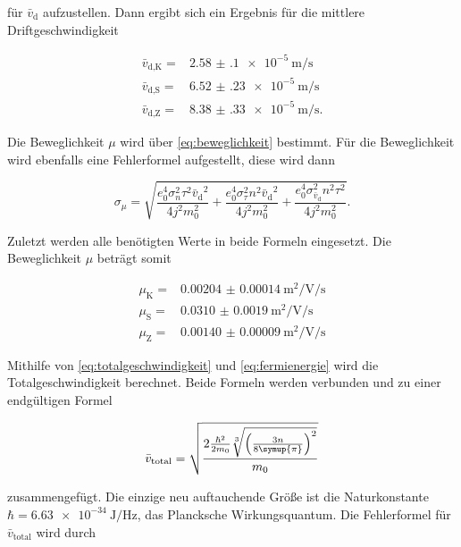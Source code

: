 für $\bar{v}_\text{d}$ aufzustellen.
Dann ergibt sich ein Ergebnis für die mittlere Driftgeschwindigkeit 

\begin{align}
    \bar{v}_\text{d,K} =& \SI{2.58(10)e-5}{\meter\per\second} \\
    \bar{v}_\text{d,S} =& \SI{6.52(23)e-5}{\meter\per\second} \\
    \bar{v}_\text{d,Z} =& \SI{8.38(33)e-5}{\meter\per\second}.
    \label{eq:vd1}
\end{align}

Die Beweglichkeit $\mu$ wird über \autoref{eq:beweglichkeit} bestimmt.
Für die Beweglichkeit wird ebenfalls eine Fehlerformel aufgestellt, diese wird dann

\begin{equation}
    \sigma _{\mu} = \sqrt{\frac{e_{0}^{4} \sigma_{n}^{2} \tau^{2} {\bar{v}_\text{d}}^{2}}{4 j^{2} m_{0}^{2}} + \frac{e_{0}^{4} \sigma_{\tau}^{2} n^{2} {\bar{v}_\text{d}}^{2}}{4 j^{2} m_{0}^{2}} + \frac{e_{0}^{4} \sigma_{\bar{v}_\text{d}}^{2} n^{2} \tau^{2}}{4 j^{2} m_{0}^{2}}}.
    \label{eq:bewegl_fehler}
\end{equation}

Zuletzt werden alle benötigten Werte in beide Formeln eingesetzt.
Die Beweglichkeit $\mu$ beträgt somit

\begin{align}
    \mu _\text{K} =& \SI{0.00204(14)}{\meter\squared\per\volt\per\second}\\
    \mu _\text{S} =& \SI{0.0310(19)}{\meter\squared\per\volt\per\second}\\
    \mu _\text{Z} =& \SI{0.00140(9)}{\meter\squared\per\volt\per\second}
    \label{eq:mue1}
\end{align}

Mithilfe von \autoref{eq:totalgeschwindigkeit} und \autoref{eq:fermienergie} wird die Totalgeschwindigkeit berechnet.
Beide Formeln werden verbunden und zu einer endgültigen Formel

\begin{equation}
    \bar{v}_\text{total} = \sqrt{\frac{2 \frac{\hbar^2}{2 m_0}\sqrt[3]{\left(\frac{3n}{8\symup{\pi}}\right)^2}}{m_0}}
    \label{eq:totalgeschw.}
\end{equation}

zusammengefügt.
Die einzige neu auftauchende Größe ist die Naturkonstante $\hbar = \SI{6.63e-34}{\joule\per\hertz}$, das Plancksche Wirkungsquantum.\cite{physics_constants}
Die Fehlerformel für $\bar{v}_\text{total}$ wird durch 

